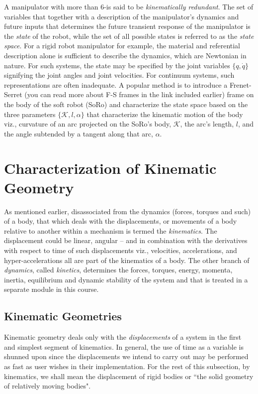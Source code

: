  A manipulator with more than 6-\dof is said to be \textit{kinematically redundant}. %
 The set of variables that together with a description of the manipulator's dynamics and future inputs that determines the future transient response of the manipulator is the \textit{state} of the robot, while the set of all possible states is referred to as the \textit{state space}. For a rigid robot manipulator for example, the material and referential description alone is sufficient to describe the dynamics, which are Newtonian in nature. For such systems, the state may be specified by the joint variables $\{q, \dot{q}\}$ signifying the joint angles and joint velocities. For continuum systems, such representations are often inadequate. A popular method is to introduce a Frenet-Serret (you can read more about F-S frames in the link included earlier) frame on the body of the soft robot (SoRo) and characterize the state space based on the three parameters \ie $\{\mathcal{K}, l, \alpha\}$ that characterize the kinematic motion of the body viz., curvature of an arc projected on the SoRo's body, $\mathcal{K}$, the arc's length, $l$, and the angle subtended by a tangent along that arc, $\alpha$.
 
 \section{Characterization of Kinematic Geometry}
 As mentioned earlier, disassociated from the dynamics (\ie forces, torques and such) of a body, that which deals with the displacements, or movements of a body relative to another within a mechanism is termed the \textit{kinematics}. The displacement could be linear, angular -- and in combination with the derivatives with respect to time of such displacements viz., velocities, accelerations, and hyper-accelerations all are part of the kinematics of a body. The other branch of \textit{dynamics}, called \textit{kinetics}, determines the forces, torques, energy, momenta, inertia, equilibrium and dynamic stability of the system and that is treated in a separate module in this course.
 
 \subsection{Kinematic Geometries}
 Kinematic geometry deals only with the \textit{displacements} of a system in the first and simplest segment of kinematics.  In general, the use of time as a variable is shunned upon since the displacements we intend to carry out may be performed as fast as user wishes in their implementation.  For the rest of this subsection, by kinematics, we shall mean the displacement of rigid bodies or ``the solid geometry of relatively moving bodies". 
 
